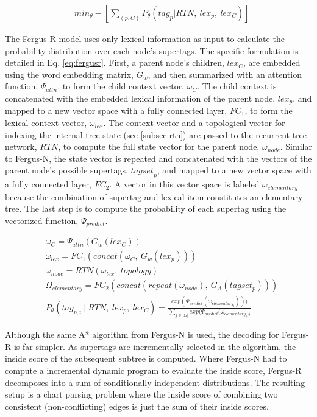 \documentclass[11pt]{article}
\begin{document}
\begin{align}
&min_{\theta} -[\sum_{(p,C)} P_\theta(tag_{p}|RTN,~lex_p,~lex_{C})] \label{eq:rtnobj}
\end{align}

The Fergus-R model uses only lexical information as input to calculate the probability distribution over each node's supertags. 
%
The specific formulation is detailed in Eq. \ref{eq:fergusr}.
%
First, a parent node's children, $lex_C$, are embedded using the word embedding matrix, $G_w$, and then summarized with an attention function, $\Psi_{attn}$, to form the child context vector, $\omega_{C}$. 
%
The child context is concatenated with the embedded lexical information of the parent node, $lex_p$, and mapped to a new vector space with a fully connected layer, $FC_1$, to form the lexical context vector, $\omega_{lex}$.
%
The context vector and a topological vector for indexing the internal tree state (see \ref{subsec:rtn}) are passed to the recurrent tree network, $RTN$, to compute the full state vector for the parent node, $\omega_{node}$.
%
Similar to Fergus-N, the state vector is repeated and concatenated with the vectors of the parent node's possible supertags, ${tagset}_p$, and mapped to a new vector space with a fully connected layer, $FC_2$.
%
A vector in this vector space is labeled $\omega_{elementary}$ because the combination of supertag and lexical item constitutes an elementary tree.
%
The last step is to compute the probability of each supertag using the vectorized function, $\Psi_{predict}$.

\begin{align}
&\omega_{C} = \Psi_{attn}(G_w(lex_C)) \label{eq:fergusr} \\
&\omega_{lex} = FC_1(concat(\omega_{C},~G_w(lex_p))) \nonumber \\
&\omega_{node} = RTN(\omega_{lex},~topology) \nonumber \\
&\Omega_{elementary} = FC_2(concat(repeat(\omega_{node}),~G_\Lambda(tagset_p))) \nonumber \\
&P_\theta(tag_{p,i}~|~RTN,~lex_p,~lex_{C}) = 
\frac{exp(\Psi_{predict}(\omega_{elementary_i})))}
{\sum_{j \in |\Omega|} exp(\Psi_{predict}(\omega_{elementary_j))}} \nonumber
\end{align}

Although the same A* algorithm from Fergus-N is used, the decoding for Fergus-R is far simpler.
%
As supertags are incrementally selected in the algorithm, the inside score of the subsequent subtree is computed.  
%
Where Fergus-N had to compute a incremental dynamic program to evaluate the inside score, Fergus-R decomposes into a sum of conditionally independent distributions. 
%
The resulting setup is a chart parsing problem where the inside score of combining two consistent (non-conflicting) edges is just the sum of their inside scores. 
\end{document}
